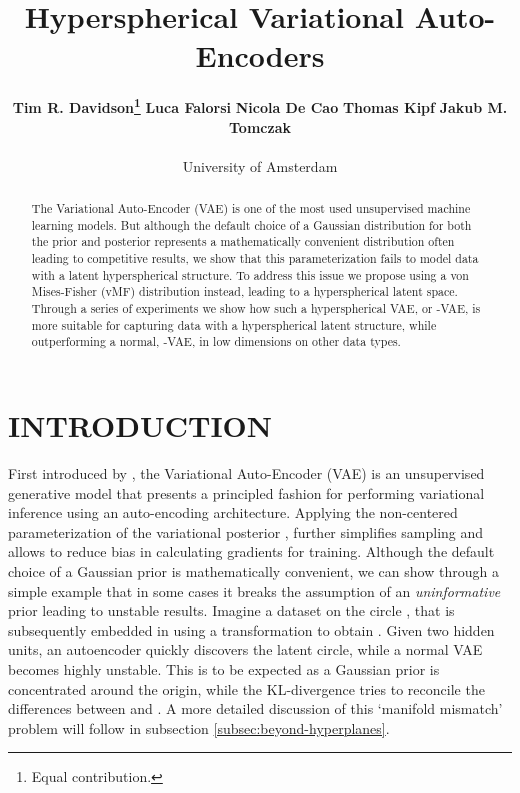 \documentclass[letterpaper]{article}
\title{Hyperspherical Variational Auto-Encoders}
\author{ {\bf Tim R. Davidson\thanks{\;\;Equal contribution.}}
\quad
{\bf Luca Falorsi\footnotemark[1]}
\quad
{\bf Nicola De Cao\footnotemark[1]}
\quad
{\bf Thomas Kipf}
\quad
{\bf Jakub M. Tomczak}\\\\
University of Amsterdam
}
\begin{document}
\maketitle

\begin{abstract}
The Variational Auto-Encoder (VAE) is one of the most used unsupervised machine learning models. But although the default choice of a Gaussian distribution for both the prior and posterior represents a mathematically convenient distribution often leading to competitive results, we show that this parameterization fails to model data with a latent hyperspherical structure. To address this issue we propose using a von Mises-Fisher (vMF) distribution instead, leading to a hyperspherical latent space. Through a series of experiments we show how such a hyperspherical VAE, or \Sv-VAE, is more suitable for capturing data with a hyperspherical latent structure, while outperforming a normal, \Nv-VAE, in low dimensions on other data types.
\end{abstract}

\section{INTRODUCTION}

First introduced by \cite{journals/corr/KingmaW13, rezende2014stochastic}, the Variational Auto-Encoder (VAE) is an unsupervised generative model that presents a principled fashion for performing variational inference using an auto-encoding architecture. Applying the non-centered parameterization of the variational posterior \citep{KingmaWelling-2014-eff-gradient-inf}, further simplifies sampling and allows to reduce bias in calculating gradients for training. Although the default choice of a Gaussian prior is mathematically convenient, we can show through a simple example that in some cases it breaks the assumption of an \textit{uninformative} prior leading to unstable results. Imagine a dataset on the circle , that is subsequently embedded in  using a transformation  to obtain . Given two hidden units, an autoencoder quickly discovers the latent circle, while a normal VAE becomes highly unstable. This is to be expected as a Gaussian prior is concentrated around the origin, while the KL-divergence tries to reconcile the differences between  and . A more detailed discussion of this `manifold mismatch' problem will follow in subsection \ref{subsec:beyond-hyperplanes}. 
\end{document}
